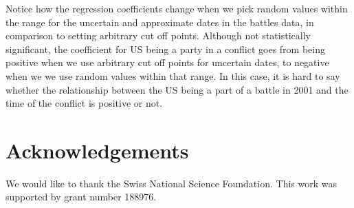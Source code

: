 \documentclass[
]{jss}
\begin{document}
Notice how the regression coefficients change when we pick random values
within the range for the uncertain and approximate dates in the battles
data, in comparison to setting arbitrary cut off points. Although not
statistically significant, the coefficient for US being a party in a
conflict goes from being positive when we use arbitrary cut off points
for uncertain dates, to negative when we we use random values within
that range. In this case, it is hard to say whether the relationship
between the US being a part of a battle in 2001 and the time of the
conflict is positive or not.

\hypertarget{acknowledgements}{%
\section{Acknowledgements}\label{acknowledgements}}

We would like to thank the Swiss National Science Foundation. This work
was supported by grant number 188976.

\renewcommand\refname{References}

\end{document}
